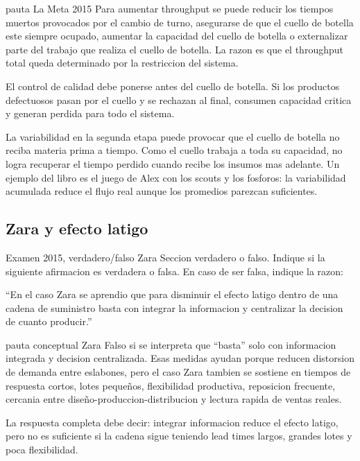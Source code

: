 \begin{pautacompleta}{pauta La Meta 2015}
Para aumentar throughput se puede reducir los tiempos muertos provocados por el cambio de turno, asegurarse de que el cuello de botella este siempre ocupado, aumentar la capacidad del cuello de botella o externalizar parte del trabajo que realiza el cuello de botella. La razon es que el throughput total queda determinado por la restriccion del sistema.

El control de calidad debe ponerse antes del cuello de botella. Si los productos defectuosos pasan por el cuello y se rechazan al final, consumen capacidad critica y generan perdida para todo el sistema.

La variabilidad en la segunda etapa puede provocar que el cuello de botella no reciba materia prima a tiempo. Como el cuello trabaja a toda su capacidad, no logra recuperar el tiempo perdido cuando recibe los insumos mas adelante. Un ejemplo del libro es el juego de Alex con los scouts y los fosforos: la variabilidad acumulada reduce el flujo real aunque los promedios parezcan suficientes.
\end{pautacompleta}

\subsection{Zara y efecto latigo}

\begin{enunciado}{Examen 2015, verdadero/falso Zara}
Seccion verdadero o falso. Indique si la siguiente afirmacion es verdadera o falsa. En caso de ser falsa, indique la razon:

``En el caso Zara se aprendio que para disminuir el efecto latigo dentro de una cadena de suministro basta con integrar la informacion y centralizar la decision de cuanto producir.''
\end{enunciado}

\begin{pautacompleta}{pauta conceptual Zara}
Falso si se interpreta que ``basta'' solo con informacion integrada y decision centralizada. Esas medidas ayudan porque reducen distorsion de demanda entre eslabones, pero el caso Zara tambien se sostiene en tiempos de respuesta cortos, lotes pequeños, flexibilidad productiva, reposicion frecuente, cercania entre diseño-produccion-distribucion y lectura rapida de ventas reales.

La respuesta completa debe decir: integrar informacion reduce el efecto latigo, pero no es suficiente si la cadena sigue teniendo lead times largos, grandes lotes y poca flexibilidad.
\end{pautacompleta}


